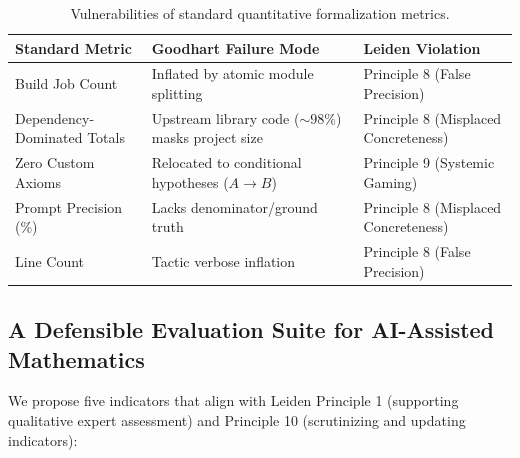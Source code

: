 \documentclass[11pt,a4paper]{article}
\theoremstyle{definition}
\theoremstyle{remark}
\begin{document}
\begin{table}[htbp]
\centering
\small
\begin{tabular}{lll}
\toprule
\textbf{Standard Metric} & \textbf{Goodhart Failure Mode} & \textbf{Leiden Violation} \\
\midrule
Build Job Count & Inflated by atomic module splitting & Principle 8 (False Precision) \\
Dependency-Dominated Totals & Upstream library code ($\sim 98\%$) masks project size & Principle 8 (Misplaced Concreteness) \\
Zero Custom Axioms & Relocated to conditional hypotheses ($A \to B$) & Principle 9 (Systemic Gaming) \\
Prompt Precision (\%) & Lacks denominator/ground truth & Principle 8 (Misplaced Concreteness) \\
Line Count & Tactic verbose inflation & Principle 8 (False Precision) \\
\bottomrule
\end{tabular}
\caption{Vulnerabilities of standard quantitative formalization metrics.}
\label{tab:metric_vulnerabilities}
\end{table}

\subsection{A Defensible Evaluation Suite for AI-Assisted Mathematics}

We propose five indicators that align with Leiden Principle 1 (supporting qualitative expert assessment) and Principle 10 (scrutinizing and updating indicators):
\end{document}
